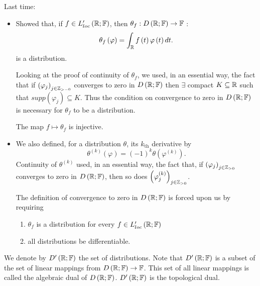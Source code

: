 
Last time: 
\begin{itemize}
	\item Showed that, if $f \in  L_{loc}' \left( \mathbb{R}; \mathbb{F} \right) $, then $\theta_{f} : D\left( \mathbb{R}; \mathbb{F} \right)  \to \mathbb{F}$ : 
		\[
			\theta_{f}\left( \varphi \right) = \int_{\mathbb{R}}^{ } f\left( t  \right) \varphi\left( t \right) dt 
		.\] is a distribution. 

Looking at the proof of continuity of $\theta_{f}$, we used, in an essential way, the fact that if $\left( \varphi_{j} \right) _{j \in \mathbb{Z}_{>-0}}$ converges to zero in $D\left( \mathbb{R}; \mathbb{F} \right) $ then $\exists $ compact $K \subseteq \mathbb{R}$ such that $supp\left( \varphi_{j} \right) \subseteq K$. Thus the condition on convergence to zero in $D\left( \mathbb{R} ; \mathbb{F}\right) $ is necessary for $\theta_{f}$ to be a distribution. 

\begin{note}
	The map $f \longmapsto \theta _{f}$ is injective.
\end{note}
\item We also defined, for a distribution $\theta$, its $k_{\text{th}}$ derivative by 
	\[
		\theta^{\left( k \right) }\left( \varphi \right)  = \left( -1 \right) ^{k}\theta \left( \varphi^{\left( k \right) } \right) 
	.\] 
	Continuity of $\theta^{\left( k \right) }$ used, in an essential way, the fact that, if $\left( \varphi_{j} \right) _{j \in \mathbb{Z}_{>0}}$ converges to zero in $D\left( \mathbb{R}; \mathbb{F} \right) $, then so does $\left( \varphi_{j}^{\left( k \right) } \right) _{j \in  \mathbb{Z}_{>0}}$. 
	\begin{result}
		The definition of convergence to zero in $D\left( \mathbb{R}; \mathbb{F} \right) $ is forced upon us by requiring 
		\begin{enumerate}
			\item $\theta_{f}$ is a distribution for every $f \in  L_{loc}' \left( \mathbb{R}; \mathbb{F} \right) $ 
			\item all distributions be differentiable. 
		\end{enumerate}
	\end{result}
\end{itemize}

\begin{notation}
	We denote by $D'\left( \mathbb{R}; \mathbb{F} \right) $ the set of distributions. Note that $D'\left( \mathbb{R} ; \mathbb{F}	\right) $ is a subset of the set of linear mappings from $D\left( \mathbb{R}; \mathbb{F} \right) \to \mathbb{F}$. This set of all linear mappings is called the algebraic dual of $D\left( \mathbb{R}; \mathbb{F} \right) $. $D'\left( \mathbb{R}; \mathbb{F} \right) $ is the topological dual. 
\end{notation}

